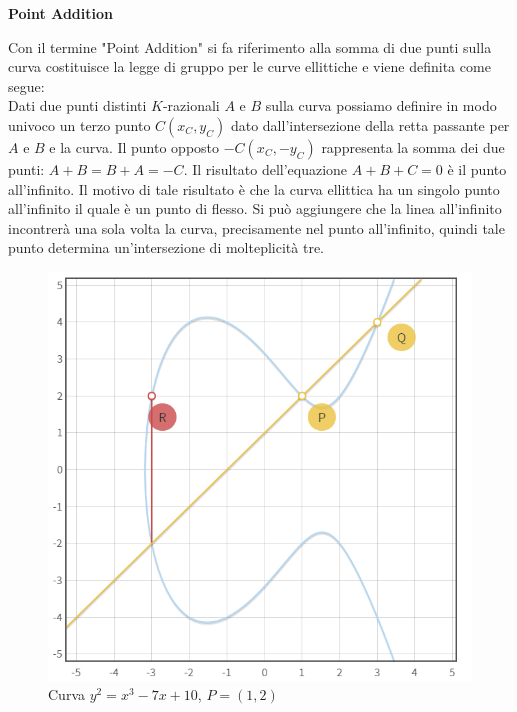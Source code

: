 \documentclass[a4paper,12pt]{tesiinfo}
\begin{document}
\begin{center}
\textbf{Point Addition}
\end{center}
Con il termine "Point Addition" si fa riferimento alla somma di due punti sulla curva costituisce la legge di gruppo per le curve ellittiche e viene definita come segue: 
\\
Dati due punti distinti $K$-razionali $A$ e $B$ sulla curva possiamo definire in modo univoco un terzo punto $C(x_C, y_C)$ dato dall'intersezione della retta passante per $A$ e $B$ e la curva. Il punto opposto $-C(x_C, -y_C)$ rappresenta la somma dei due punti: $A + B = B+ A = -C$. Il risultato dell'equazione $A+B+C = 0$ \`e il punto all'infinito. Il motivo di tale risultato \`e che la curva ellittica ha un singolo punto all'infinito il quale \`e un punto di flesso. Si pu\`o aggiungere che la linea all'infinito incontrer\`a una sola volta la curva, precisamente nel punto all'infinito, quindi tale punto determina un'intersezione di molteplicit\`a tre.
\begin{figure}[ht]
    \includegraphics[width=.75\textwidth,center]{PA_P+Q}
    \caption{Curva $y^2 = x^3-7x+10$, $P=(1, 2)$}
\end{figure}
\end{document}
